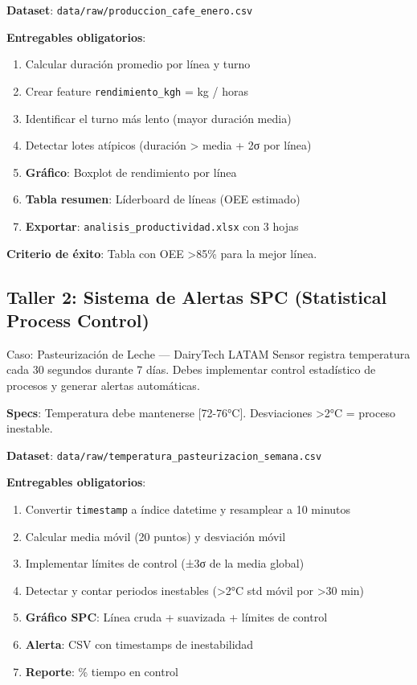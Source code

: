 \documentclass[11pt, a4paper]{article}
\begin{document}
\textbf{Dataset}: \texttt{data/raw/produccion\_cafe\_enero.csv}

\textbf{Entregables obligatorios}:
\begin{enumerate}
    \item Calcular duración promedio por línea y turno
    \item Crear feature \texttt{rendimiento\_kgh} = kg / horas
    \item Identificar el turno más lento (mayor duración media)
    \item Detectar lotes atípicos (duración > media + 2σ por línea)
    \item \textbf{Gráfico}: Boxplot de rendimiento por línea
    \item \textbf{Tabla resumen}: Líderboard de líneas (OEE estimado)
    \item \textbf{Exportar}: \texttt{analisis\_productividad.xlsx} con 3 hojas
\end{enumerate}

\textbf{Criterio de éxito}: Tabla con OEE >85\% para la mejor línea.

\subsection{Taller 2: Sistema de Alertas SPC (Statistical Process Control)}

\begin{industrybox}{Caso: Pasteurización de Leche — DairyTech LATAM}
Sensor registra temperatura cada 30 segundos durante 7 días. Debes implementar control estadístico de procesos y generar alertas automáticas.

\textbf{Specs}: Temperatura debe mantenerse [72-76°C]. Desviaciones >2°C = proceso inestable.
\end{industrybox}

\textbf{Dataset}: \texttt{data/raw/temperatura\_pasteurizacion\_semana.csv}

\textbf{Entregables obligatorios}:
\begin{enumerate}
    \item Convertir \texttt{timestamp} a índice datetime y resamplear a 10 minutos
    \item Calcular media móvil (20 puntos) y desviación móvil
    \item Implementar límites de control (±3σ de la media global)
    \item Detectar y contar periodos inestables (>2°C std móvil por >30 min)
    \item \textbf{Gráfico SPC}: Línea cruda + suavizada + límites de control
    \item \textbf{Alerta}: CSV con timestamps de inestabilidad
    \item \textbf{Reporte}: \% tiempo en control
\end{enumerate}
\end{document}
